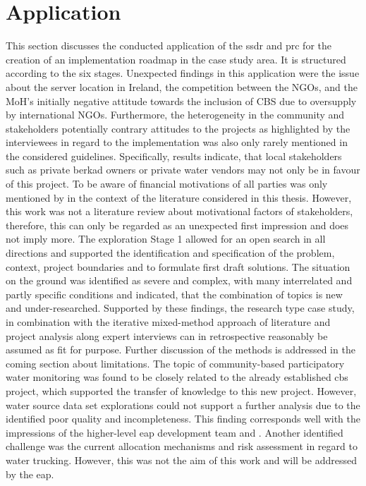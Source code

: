 \section{Application}

This section discusses the conducted application of the \acrshort{ssdr} and \acrshort{prc} for the creation of an implementation roadmap in the case study area. It is structured according to the six stages. Unexpected findings in this application were the issue about the server location in Ireland, the competition between the NGOs, and the MoH's initially negative attitude towards the inclusion of CBS due to oversupply by international NGOs. Furthermore, the heterogeneity in the community and stakeholders potentially contrary attitudes to the projects as highlighted by the interviewees in regard to the implementation was also only rarely mentioned in the considered guidelines. Specifically, results indicate, that local stakeholders such as private berkad owners or private water vendors may not only be in favour of this project. To be aware of financial motivations of all parties was only mentioned by \autocite{minkmanCitizenScienceWater2015} in the context of the literature considered in this thesis. However, this work was not a literature review about motivational factors of stakeholders, therefore, this can only be regarded as an unexpected first impression and does not imply more.\newline
The exploration Stage 1 allowed for an open search in all directions and supported the identification and specification of the problem, context, project boundaries and to formulate first draft solutions. The situation on the ground was identified as severe and complex, with many interrelated and partly specific conditions and indicated, that the combination of topics is new and under-researched. Supported by these findings, the research type case study, in combination with the iterative mixed-method approach of literature and project analysis along expert interviews can in retrospective reasonably be assumed as fit for purpose. Further discussion of the methods is addressed in the coming section about limitations.\newline
The topic of community-based participatory water monitoring was found to be closely related to the already established \acrshort{cbs} project, which supported the transfer of knowledge to this new project. However, water source data set explorations could not support a further analysis due to the identified poor quality and incompleteness. This finding corresponds well with the impressions of the higher-level \acrshort{eap} development team and \autocite{harrowsmithFutureForecastImpact2020}. Another identified challenge was the current allocation mechanisms and risk assessment in regard to water trucking. However, this was not the aim of this work and will be addressed by the \acrshort{eap}.
